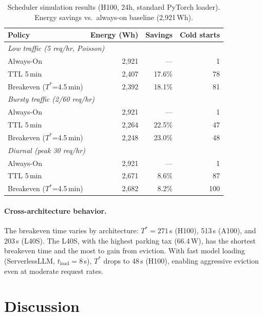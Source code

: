 \documentclass[sigconf,nonacm]{acmart}
\begin{document}
\begin{table}[t]
\caption{Scheduler simulation results (H100, 24h, standard PyTorch loader). Energy savings vs.\ always-on baseline (2{,}921\,Wh).}
\label{tab:scheduler}
\small
\begin{tabular}{lrrr}
\toprule
\textbf{Policy} & \textbf{Energy (Wh)} & \textbf{Savings} & \textbf{Cold starts} \\
\midrule
\multicolumn{4}{l}{\emph{Low traffic (5 req/hr, Poisson)}} \\
Always-On & 2{,}921 & --- & 1 \\
TTL 5\,min & 2{,}407 & 17.6\% & 78 \\
Breakeven ($T^*$=4.5\,min) & 2{,}392 & 18.1\% & 81 \\
\midrule
\multicolumn{4}{l}{\emph{Bursty traffic (2/60 req/hr)}} \\
Always-On & 2{,}921 & --- & 1 \\
TTL 5\,min & 2{,}264 & 22.5\% & 47 \\
Breakeven ($T^*$=4.5\,min) & 2{,}248 & 23.0\% & 48 \\
\midrule
\multicolumn{4}{l}{\emph{Diurnal (peak 30 req/hr)}} \\
Always-On & 2{,}921 & --- & 1 \\
TTL 5\,min & 2{,}671 & 8.6\% & 87 \\
Breakeven ($T^*$=4.5\,min) & 2{,}682 & 8.2\% & 100 \\
\bottomrule
\end{tabular}
\end{table}

\paragraph{Cross-architecture behavior.} The breakeven time varies by architecture: $T^* = 271$\,s (H100), 513\,s (A100), and 203\,s (L40S). The L40S, with the highest parking tax (66.4\,W), has the shortest breakeven time and the most to gain from eviction. With fast model loading (ServerlessLLM, $t_{\text{load}} = 8$\,s), $T^*$ drops to 48\,s (H100), enabling aggressive eviction even at moderate request rates.

\section{Discussion}
\end{document}
